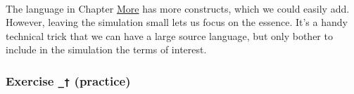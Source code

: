 \begin{fence}
\begin{code}
\AgdaSpace{}%
\AgdaSpace{}%
\<%
\\
%
\\[\AgdaEmptyExtraSkip]%
%
\>[2]\AgdaSpace{}%
\AgdaSymbol{:}\AgdaSpace{}%
\AgdaSpace{}%
\AgdaSymbol{\{}\AgdaSpace{}%
\AgdaSpace{}%
\AgdaSymbol{\}}\AgdaSpace{}%
\AgdaSymbol{\{}\AgdaSpace{}%
\AgdaSpace{}%
\AgdaSymbol{:}\AgdaSpace{}%
\AgdaSpace{}%
\AgdaSpace{}%
\AgdaSymbol{\}}\AgdaSpace{}%
\AgdaSymbol{\{}\AgdaSpace{}%
\AgdaSpace{}%
\AgdaSymbol{:}\AgdaSpace{}%
\AgdaSpace{}%
\AgdaOperator{\AgdaInductiveConstructor{,}}\AgdaSpace{}%
\AgdaSpace{}%
\AgdaSpace{}%
\AgdaSymbol{\}}\<%
\\
\>[2][@{}l@{\AgdaIndent{0}}]%
\>[4]\AgdaSpace{}%
\AgdaSpace{}%
\AgdaOperator{\AgdaDatatype{\textasciitilde{}}}\AgdaSpace{}%
\<%
\\
%
\>[4]%
\>[112I]\AgdaSpace{}%
\AgdaOperator{\AgdaDatatype{\textasciitilde{}}}\AgdaSpace{}%
\<%
\\
\>[.][@{}l@{}]\<[112I]%
\>[6]\AgdaComment{----------------------}\<%
\\
%
\>[4]\AgdaSpace{}%
\AgdaSpace{}%
\AgdaSpace{}%
\AgdaSpace{}%
\AgdaOperator{\AgdaDatatype{\textasciitilde{}}}\AgdaSpace{}%
\AgdaSymbol{(}\AgdaSpace{}%
\AgdaSymbol{)}\AgdaSpace{}%
\AgdaSpace{}%
\<%
\end{code}
\end{fence}

The language in Chapter \protect\hyperlink{More}{More} has more
constructs, which we could easily add. However, leaving the simulation
small lets us focus on the essence. It's a handy technical trick that we
can have a large source language, but only bother to include in the
simulation the terms of interest.

\hypertarget{exercise-_-practice}{%
\subsubsection{\texorpdfstring{Exercise \texttt{\_†}
(practice)}{Exercise \_† (practice)}}\label{exercise-_-practice}}

